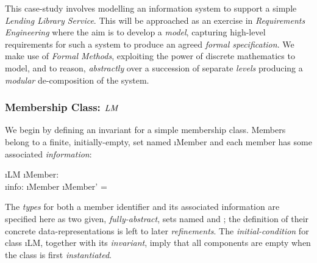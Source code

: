 \documentclass[12pt,a4paper]{article}
\newcounter{exer} %
\begin{document}
		
		
		
		
		
		
\iffalse

\pagebreak
		
		
		
		
		




\noindent This case-study involves modelling an information system to support a simple
\emph{Lending Library Service}. This will be approached as an exercise in
\emph{Requirements Engineering}
where the aim is to develop a \emph{model}, capturing
high-level requirements for such a system
to produce an agreed \emph{formal specification}.
We make use of \emph{Formal Methods},
exploiting the power of discrete mathematics
to model, and to reason, \emph{abstractly} over a succession of separate \emph{levels}
producing a \emph{modular} de-composition of the system.



\subsubsection*{Membership Class: $\mathit{LM}$}

We begin by defining an invariant for a simple membership class. Members belong to a finite, initially-empty,
set named \i{Member} and each member has some associated \emph{information}:
\begin{showspecs}
	\begin{spec}{\i{LM}}
		\i{Member}: \;\\
		\i{info}: \i{Member} \tfun {}
	\post	\i{Member'} = \emptyset
	\end{spec}
\end{showspecs}

\noindent
The \emph{types} for both a member identifier and its
associated information are specified here as two given, \emph{fully-abstract}, sets named  and ;
the definition of their concrete data-representations is left to later \emph{refinements}.
The \emph{initial-condition} for class \i{LM},
together with its \emph{invariant}, imply that all components
are empty when the class is first \emph{instantiated}.
\end{document}
